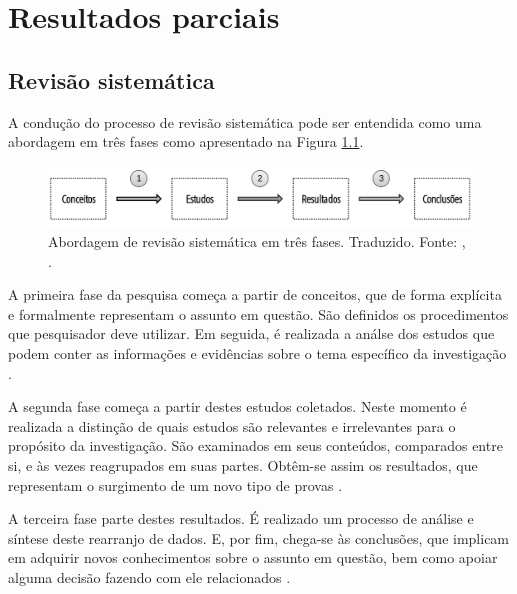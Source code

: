 \chapter[Resultados parciais]{Resultados parciais}\label{ch:resultados}


\section{Revisão sistemática}

A condução do processo de revisão sistemática pode ser entendida como uma abordagem em três fases como apresentado na Figura \ref{fig:fases_rs}.

\begin{figure}[!htb]
    \centering
    \includegraphics[scale=0.4]{figuras/fases_rs.png}    
    \caption{Abordagem de revisão sistemática em três fases. Traduzido. Fonte: \citeauthor{biolchini2005}, \citeyear{biolchini2005}.}
    \label{fig:fases_rs}
\end{figure}


A primeira fase da pesquisa começa a partir de conceitos, que de forma explícita e formalmente representam o assunto em questão. São definidos os procedimentos que pesquisador deve utilizar. Em seguida, é realizada a análse dos estudos que podem conter as informações e evidências sobre o tema específico da investigação \cite{biolchini2005}. 

A segunda fase começa a partir destes estudos coletados. Neste momento é realizada a distinção de quais estudos são relevantes e irrelevantes para o propósito da investigação. São examinados em seus conteúdos, comparados entre si, e às vezes reagrupados em suas partes. Obtêm-se assim os resultados, que representam o surgimento de um novo tipo de provas \cite{biolchini2005}. 

A terceira fase parte destes resultados. É realizado um processo de análise e síntese deste rearranjo de dados. E, por fim, chega-se às conclusões, que implicam em adquirir novos conhecimentos sobre o assunto em questão, bem como apoiar alguma decisão fazendo com ele relacionados \cite{biolchini2005}.




